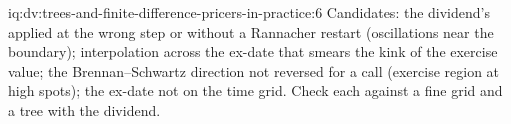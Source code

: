\begin{solution}{iq:dv:trees-and-finite-difference-pricers-in-practice:6}
Candidates: the dividend's  applied at the wrong step or without a Rannacher restart (oscillations near the boundary); interpolation across the
ex-date that smears the kink of the exercise value; the Brennan--Schwartz direction not reversed for a call (exercise region at high spots); the ex-date not
on the time grid. Check each against a fine grid and a tree with the dividend.
\end{solution}

